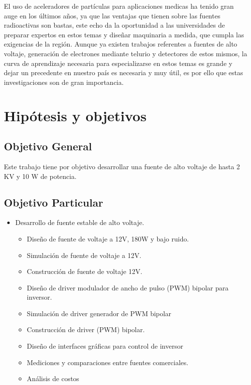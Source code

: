 El uso de aceleradores de partículas para aplicaciones medicas ha tenido gran auge en los últimos años, ya que las ventajas que tienen sobre las fuentes radioactivas son bastas, este echo da la oportunidad a las universidades de preparar expertos en estos temas y diseñar maquinaria a medida, que cumpla las exigencias de la región. Aunque ya existen trabajos referentes a fuentes de alto voltaje, generación de electrones mediante telurio y detectores de estos mismos, la curva de aprendizaje necesaria para especializarse en estos temas es grande y dejar un precedente en nuestro país es necesaria y muy útil, es por ello que estas
investigaciones son de gran importancia.
\section{Hipótesis y objetivos}

\subsection{Objetivo General}

Este trabajo tiene por objetivo desarrollar una fuente de alto voltaje de hasta 2 KV y 10 W de potencia.

\subsection{Objetivo Particular}


\begin{itemize}
\item Desarrollo de fuente estable de alto voltaje.
\begin{itemize}
\item Diseño de fuente de voltaje a 12V, 180W y bajo ruido.
\item Simulación de fuente de voltaje a 12V.
\item Construcción de fuente de voltaje 12V.
\item Diseño de driver modulador de ancho de pulso (PWM) bipolar para inversor.
\item Simulación de driver generador de PWM bipolar
\item Construcción de driver (PWM) bipolar.
\item Diseño de interfaces gráficas para control de inversor
\item Mediciones y comparaciones entre fuentes comerciales.
\item Análisis de costos
\end{itemize}  
\end{itemize}

